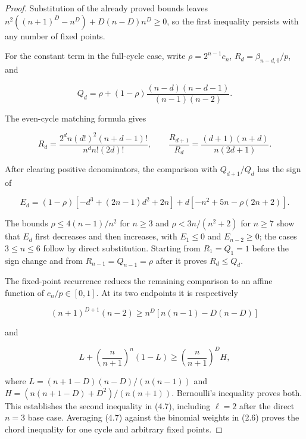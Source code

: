 \documentclass[11pt]{article}
\begin{document}
\begin{proof}
Substitution of the already proved bounds leaves
$n^2((n+1)^D-n^D)+D(n-D)n^D\ge0$, so the first inequality
persists with any number of fixed points.

For the constant term in the full-cycle case, write
$\rho=2^{n-1}c_n$, $R_d=\beta_{n-d,0}/p$, and

\[
 Q_d=\rho+(1-\rho)
 \frac{(n-d)(n-d-1)}{(n-1)(n-2)}.
\]

The even-cycle matching formula gives

\[
 R_d=\frac{2^dn(d!)^2(n+d-1)!}{n^dn!(2d)!},
 \qquad
 \frac{R_{d+1}}{R_d}=\frac{(d+1)(n+d)}{n(2d+1)}.
\]

After clearing positive denominators, the comparison with
$Q_{d+1}/Q_d$ has the sign of

\[
 E_d=(1-\rho)[-d^3+(2n-1)d^2+2n]
 +d[-n^2+5n-\rho(2n+2)].
\]

The bounds $\rho\le4(n-1)/n^2$ for $n\ge3$ and
$\rho<3n/(n^2+2)$ for $n\ge7$ show that $E_d$ first decreases
and then increases, with $E_1\le0$ and $E_{n-2}\ge0$; the cases
$3\le n\le6$ follow by direct substitution.  Starting from
$R_1=Q_1=1$ before the sign change and from
$R_{n-1}=Q_{n-1}=\rho$ after it proves $R_d\le Q_d$.

The fixed-point recurrence reduces the remaining comparison to an affine
function of $c_n/p\in[0,1]$.  At its two endpoints it is respectively

\[
 (n+1)^{D+1}(n-2)
 \ge n^D[n(n-1)-D(n-D)]
\]

and

\[
 L+\left(\frac n{n+1}\right)^n(1-L)
 \ge\left(\frac n{n+1}\right)^D H,
\]

where $L=(n+1-D)(n-D)/(n(n-1))$ and
$H=(n(n+1-D)+D^2)/(n(n+1))$.  Bernoulli's inequality proves both.
This establishes the second inequality in (4.7), including $\ell=2$
after the direct $n=3$ base case.  Averaging (4.7) against the binomial
weights in (2.6) proves the chord inequality for one cycle and arbitrary
fixed points.


\end{proof}
\end{document}
